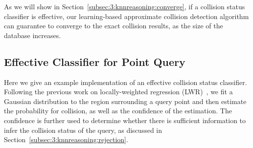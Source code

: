 As we will show in Section~\ref{subsec:3:knnreasoning:converge}, if a collision status classifier is effective, our learning-based approximate collision detection algorithm can guarantee to converge to the exact collision results, as the size of the database increases.

\subsection{Effective Classifier for Point Query}
\label{subsec:3:knnreasoning:pointclassifier}
Here we give an example implementation of an effective collision status classifier. Following the previous work on locally-weighted regression (LWR)~\cite{Cohn96activelearning,Burns:2005:ICRA}, we fit a Gaussian distribution to the region surrounding a query point and then estimate the probability for collision, as well as the confidence of the estimation. The confidence is further used to determine whether there is sufficient information to infer the collision status of the query, as discussed in Section~\ref{subsec:3:knnreasoning:rejection}.

